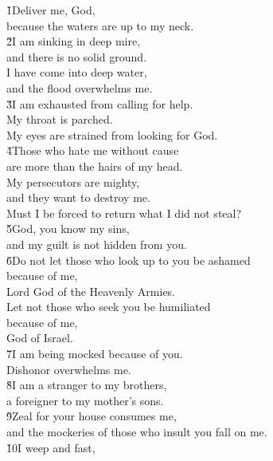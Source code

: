 \begin{poetry}
\poeml \v{1}Deliver me, God, \\
\poemll    because the waters are up to my neck. \\
\poeml \v{2}I am sinking in deep mire, \\
\poemll    and there is no solid ground. \\
\poeml I have come into deep water, \\
\poemll    and the flood overwhelms me. \\
\poeml \v{3}I am exhausted from calling for help. \\
\poemll    My throat is parched. \\
\poemlll       My eyes are strained from looking for God. \\
\poeml \v{4}Those who hate me without cause \\
\poemll    are more than the hairs of my head. \\
\poeml My persecutors are mighty, \\
\poemll    and they want to destroy me. \\
\poemlll       Must I be forced to return what I did not steal? \\
\poeml \v{5}God, you know my sins, \\
\poemll    and my guilt is not hidden from you. \\
\poeml \v{6}Do not let those who look up to you be ashamed \\
\poemll    because of me, \\
\poemlll       Lord God of the Heavenly Armies. \\
\poeml Let not those who seek you be humiliated \\
\poemll    because of me, \\
\poemlll       God of Israel. \\
\poeml \v{7}I am being mocked because of you. \\
\poemll    Dishonor overwhelms me. \\
\poeml \v{8}I am a stranger to my brothers, \\
\poemll    a foreigner to my mother's sons. \\
\poeml \v{9}Zeal for your house consumes me, \\
\poemll    and the mockeries of those who insult you fall on me. \\
\poeml \v{10}I weep and fast, \\

\end{poetry}
